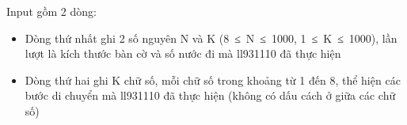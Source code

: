 Input gồm 2 dòng:
\begin{itemize}
	\item Dòng thứ nhất ghi 2 số nguyên N và K (8 ≤ N ≤ 1000, 1 ≤ K ≤ 1000), lần lượt là kích thước bàn cờ và số nước đi mà ll931110 đã thực hiện
	\item Dòng thứ hai ghi K chữ số, mỗi chữ số trong khoảng từ 1 đến 8, thể hiện các bước di chuyển mà ll931110 đã thực hiện (không có dấu cách ở giữa các chữ số)
\end{itemize}

\